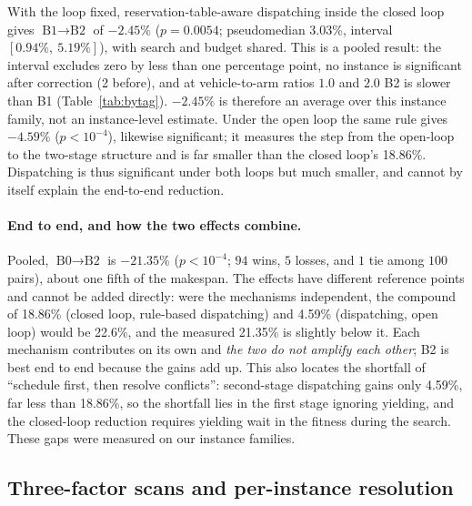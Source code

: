 \documentclass[manuscript,screen,review]{acmart}
\newcommand{\NPairs}{100}
\newcommand{\GainLoopRule}{18.86\%}      %
\newcommand{\GainProbeOpen}{4.59\%}      %
\newcommand{\PProbeOpen}{<10^{-4}}
\newcommand{\GainProbeLoop}{2.45\%}      %
\newcommand{\PProbeLoop}{=0.0054}
\newcommand{\GainEndToEnd}{21.35\%}      %
\newcommand{\PEndToEnd}{<10^{-4}}
\newcommand{\WinEndToEnd}{94}
\newcommand{\LoseEndToEnd}{5}
\newcommand{\HLProbeLoop}{3.03\%}
\newcommand{\CIProbeLoop}{$[0.94\%,\ 5.19\%]$}
\newcommand{\GainIndepProduct}{22.6\%}
\newcommand{\CellsSigProbe}{2}
\begin{document}
With the loop fixed, reservation-table-aware dispatching inside the closed loop gives $\text{B1}\to\text{B2}$ of $-\GainProbeLoop$ ($p\PProbeLoop$; pseudomedian \HLProbeLoop{}, interval \CIProbeLoop{}), with search and budget shared.
This is a pooled result: the interval excludes zero by less than one percentage point, no instance is significant after correction (\CellsSigProbe{} before), and at vehicle-to-arm ratios $1.0$ and $2.0$ B2 is slower than B1 (Table~\ref{tab:bytag}).
$-\GainProbeLoop$ is therefore an average over this instance family, not an instance-level estimate.
Under the open loop the same rule gives $-\GainProbeOpen$ ($p\PProbeOpen$), likewise significant; it measures the step from the open-loop to the two-stage structure and is far smaller than the closed loop's \GainLoopRule{}.
Dispatching is thus significant under both loops but much smaller, and cannot by itself explain the end-to-end reduction.

\paragraph{End to end, and how the two effects combine.}
\label{sec:complement}
Pooled, $\text{B0}\to\text{B2}$ is $-\GainEndToEnd$ ($p\PEndToEnd$; $\WinEndToEnd$ wins, $\LoseEndToEnd$ losses, and $1$ tie among $\NPairs$ pairs), about one fifth of the makespan.
The effects have different reference points and cannot be added directly: were the mechanisms independent, the compound of \GainLoopRule{} (closed loop, rule-based dispatching) and \GainProbeOpen{} (dispatching, open loop) would be \GainIndepProduct{}, and the measured \GainEndToEnd{} is slightly below it.
Each mechanism contributes on its own and \emph{the two do not amplify each other}; B2 is best end to end because the gains add up.
This also locates the shortfall of ``schedule first, then resolve conflicts'': second-stage dispatching gains only \GainProbeOpen{}, far less than \GainLoopRule{}, so the shortfall lies in the first stage ignoring yielding, and the closed-loop reduction requires yielding wait in the fitness during the search. These gaps were measured on our instance families.

\subsection{Three-factor scans and per-instance resolution}
\label{sec:whichcongestion}
\end{document}
